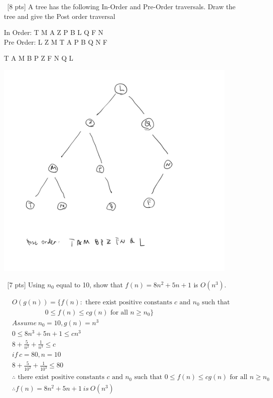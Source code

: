 \documentclass[12pt]{article}
\newenvironment{sol}[1][Solution]{\begin{trivlist}\item[\hskip\labelsep {\bfseries #1:}]}{\end{trivlist}}
\begin{document}
\begin{enumerate}
    \item \ [8 pts] A tree has the following In-Order and Pre-Order traversals. Draw the tree and give the Post order traversal \\ 
    \begin{center}
        In Order: T M A Z P B L Q F N \\
Pre Order: L Z M T A P B Q N F
    \end{center}
    \begin{sol}
        T A M B P Z F N Q L
        \begin{center}
            \includegraphics[width = 0.9\textwidth]{p1.jpg}
        \end{center}
    \end{sol}
    \item \ [7 pts] Using $n_0$ equal to 10, show that $f(n) = 8n^2 + 5n + 1 $ is $O(n^3)$.
    \begin{sol}
    \begin{align*}
        &O(g(n)) = \{f(n): \text{ there exist positive constants } c \text{ and } n_0 \text{ such that } \\
        & \ \ \ \ \ \ \ \ \ \ \ \ \ \ \ \ \ \ \ \ \ \ 0 \leq f(n) \leq cg(n) \text{ for all } n \geq n_0 \} \\
        & Assume \ n_0 = 10, g(n) = n^3 \\ 
        & 0 \leq 8n^3 + 5n + 1 \leq cn^3 \\
        & 8+\frac{5}{n^2} + \frac{1}{n^3} \leq c \\
        & if \ c = 80, n = 10\\
        & 8+\frac{5}{10^2} + \frac{1}{10^3} \leq 80\\
        & \therefore \text{ there exist positive constants } c \text{ and } n_0 \text{ such that } 0 \leq f(n) \leq cg(n) \text{ for all } n \geq n_0 \\
        & \therefore f(n) = 8n^2 + 5n + 1 \ is \ O(n^3)
    \end{align*}
    

\end{sol}
\end{enumerate}
\end{document}
